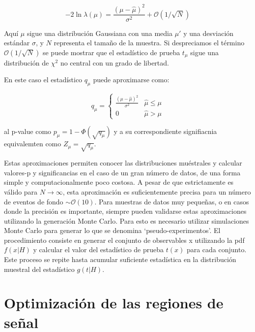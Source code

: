\begin{equation}
	-2\ln{\lambda(\mu)}=\frac{(\mu-\hat{\mu})^{2}}{\sigma^{2}}+\mathcal{O}(1/\sqrt{N})
\end{equation}

Aquí $\mu$ sigue una distribución Gaussiana con una media $\mu'$ y una desviación estándar $\sigma$, y $N$ representa el tamaño de la muestra. Si despreciamos el término $\mathcal{O}(1/\sqrt{N})$ se puede mostrar que el estadístico de prueba $t_{\mu}$ sigue una distribución de $\chi^{2}$ no central con un grado de libertad.

En este caso el estadístico $q_{\mu}$ puede aproximarse como:

\begin{equation}
	q_{\mu}=
	\begin{cases}
		\frac{(\mu-\hat{\mu})^{2}}{\sigma^{2}} & \hat{\mu}\le\mu\\
		0 & \hat{\mu}>\mu
	\end{cases}
\end{equation}

al p-value como $p_{\mu}=1-\Phi(\sqrt{q_{\mu}})$ y a su correspondiente signifiacnia equivalemten como $Z_{\mu}=\sqrt{q_{\mu}}$.

Estas aproximaciones permiten conocer las distribuciones muéstrales y calcular valores-p y significancias en el caso de un gran número de datos, de una forma simple y computacionalmente poco
costosa. A pesar de que estrictamente es válido para $N\to\infty$, esta aproximación es suficientemente
precisa para un número de eventos de fondo $\sim \mathcal{O}(10)$.
Para muestras de datos muy pequeñas, o en casos donde la precisión es importante, siempre pueden
validarse estas aproximaciones utilizando la generación Monte Carlo. Para esto es necesario utilizar
simulaciones Monte Carlo para generar lo que se denomina `pseudo-experimentos'. El procedimiento
consiste en generar el conjunto de observables x utilizando la pdf $f(x|H)$ y calcular el valor del
estadístico de prueba $t(x)$ para cada conjunto. Este proceso se repite hasta acumular suficiente
estadística en la distribución muestral del estadístico $g(t|H)$.

\section{Optimización de las regiones de señal}

